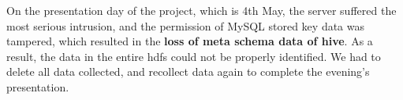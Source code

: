 On the presentation day of the project, which is 4th May, the server suffered the most serious intrusion, and the permission of MySQL stored key data was tampered, which resulted in the \textbf{loss of meta schema data of hive}. As a result, the data in the entire hdfs could not be properly identified. We had to delete all data collected, and recollect data again to complete the evening's presentation.